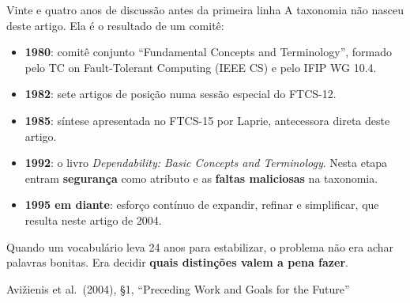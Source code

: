 \documentclass{beamer}
\newcommand{\sect}[1]{\par\smallskip\hfill{\tiny\color{black!55}Avi\v{z}ienis et al.\ (2004), #1}}
\begin{document}
\begin{frame}{Vinte e quatro anos de discuss\~ao antes da primeira linha}
    \footnotesize
    A taxonomia n\~ao nasceu deste artigo. Ela \'e o resultado de um comit\^e:
    \medskip
    \begin{itemize}
        \item \textbf{1980}: comit\^e conjunto ``Fundamental Concepts and Terminology'', formado pelo TC on Fault-Tolerant Computing (IEEE CS) e pelo IFIP WG 10.4.
        \item \textbf{1982}: sete artigos de posi\c{c}\~ao numa sess\~ao especial do FTCS-12.
        \item \textbf{1985}: s\'intese apresentada no FTCS-15 por Laprie, antecessora direta deste artigo.
        \item \textbf{1992}: o livro \textit{Dependability: Basic Concepts and Terminology}. Nesta etapa entram \textbf{seguran\c{c}a} como atributo e as \textbf{faltas maliciosas} na taxonomia.
        \item \textbf{1995 em diante}: esfor\c{c}o cont\'inuo de expandir, refinar e simplificar, que resulta neste artigo de 2004.
    \end{itemize}
    \medskip
    \begin{ancora}
        \footnotesize
        Quando um vocabul\'ario leva 24 anos para estabilizar, o problema n\~ao era achar palavras bonitas. Era decidir \textbf{quais distin\c{c}\~oes valem a pena fazer}.
    \end{ancora}
    \sect{\S1, ``Preceding Work and Goals for the Future''}
\end{frame}
\end{document}
